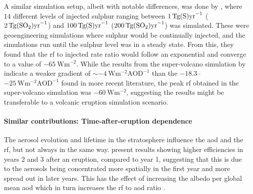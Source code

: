 \documentclass{ametsocV5}
\begin{document}
A similar simulation setup, albeit with notable differences, was done by
\citet{niemeier2015}, where \(14\) different levels of injected sulphur ranging between
\(\SI{1}{\tera\gram(\ce{S})\mathrm{yr}^{-1}}\)
(\(\SI{2}{\tera\gram(\ce{SO2})\mathrm{yr}^{-1}}\)) and
\(\SI{100}{\tera\gram(\ce{S})\mathrm{yr}^{-1}}\)
(\(\SI{200}{\tera\gram(\ce{SO2})\mathrm{yr}^{-1}}\)) was simulated. These were
geoengineering simulations where sulphur would be continually injected, and the
simulations run until the sulphur level was in a steady state. From this, they found
that the \ac{rf} to injected  rate ratio would follow an exponential and
converge to a value of \(\SI{-65}{\watt\metre^{-2}}\). While the results from the
super-volcano simulation by \citet{jones2005} indicate a weaker gradient of \(\sim
\SI{-4}{\watt\metre^{-2}\mathrm{AOD}^{-1}}\) than the
\(-18.3\)--\(\SI{-25}{\watt\metre^{-2}\mathrm{AOD}^{-1}}\) found in more recent
literature, the peak \ac{rf} obtained in the super-volcano simulation was
\(\SI{-60}{\watt\metre^{-2}}\), suggesting the \citet{niemeier2015} results might be
transferable to a volcanic eruption simulation scenario.

\paragraph*{Similar contributions: Time-after-eruption dependence}

The aerosol evolution and lifetime in the stratosphere influence the \ac{aod} and the
\ac{rf}, but not always in the same way. \citet{marshall2020} present results showing
higher efficiencies in years 2 and 3 after an eruption, compared to year 1, suggesting
that this is due to the aerosols being concentrated more spatially in the first year and
more spread out in later years. This has the effect of increasing the albedo per global
mean \ac{aod} which in turn increases the \ac{rf} to \ac{aod} ratio
\citep{marshall2020}.

\end{document}
